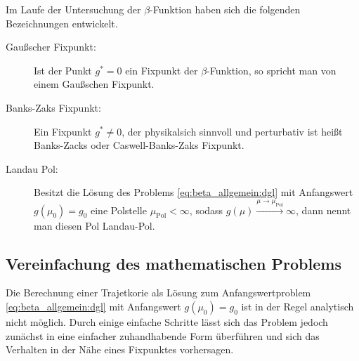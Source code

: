   Im Laufe der Untersuchung der $\beta$-Funktion haben sich die folgenden Bezeichnungen 
  entwickelt.
  \begin{description}
   \item[Gaußscher Fixpunkt: ] Ist der Punkt $g^*=0$ ein Fixpunkt der $\beta$-Funktion, so 
			      spricht man von einem Gaußschen Fixpunkt.
   \item[Banks-Zaks Fixpunkt: ] Ein Fixpunkt $g^*\neq 0$, der physikalsich sinnvoll und 
			      perturbativ ist heißt Banks-Zacks oder 
			      Caswell-Banks-Zaks Fixpunkt.
   \item[Landau Pol: ] Besitzt die Lösung des Problems \eqref{eq:beta_allgemein:dgl} mit 
		      Anfangswert $g(\mu_0)=g_0$ eine Polstelle $\mu_\text{Pol}<\infty$, sodass 
		      $g(\mu)\overset{\mu\to\mu_\text{Pol}}{\longrightarrow}\infty$, dann nennt 
		      man diesen Pol Landau-Pol.
  \end{description}
  
  \subsection{Vereinfachung des mathematischen Problems}
      Die Berechnung einer Trajetkorie als Lösung zum Anfangswertproblem 
      \eqref{eq:beta_allgemein:dgl} mit Anfangswert $g(\mu_0)=g_0$ 
      ist in der Regel analytisch nicht möglich. Durch einige einfache Schritte lässt sich das 
      Problem jedoch zunächst in eine einfacher zuhandhabende Form überführen und sich das 
      Verhalten in der Nähe eines Fixpunktes vorhersagen.
      
